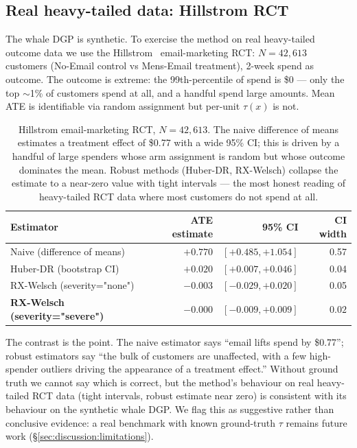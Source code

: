 \subsection{Real heavy-tailed data: Hillstrom RCT}
\label{sec:experiments:hillstrom}
The whale DGP is synthetic. To exercise the method on real
heavy-tailed outcome data we use the Hillstrom~\citep{hillstrom2008}
email-marketing RCT: $N = 42{,}613$ customers (No-Email control vs
Mens-Email treatment), 2-week spend as outcome. The outcome is
extreme: the 99th-percentile of spend is \$0 --- only the top $\sim$1\%
of customers spend at all, and a handful spend large amounts. Mean
ATE is identifiable via random assignment but per-unit
$\tau(x)$ is not.

\begin{table}[!t]
\centering
\small
\begin{tabular}{lrrr}
\toprule
Estimator & ATE estimate & 95\% CI & CI width \\
\midrule
Naive (difference of means) & $+0.770$ & $[+0.485, +1.054]$ & 0.57 \\
Huber-DR (bootstrap CI)     & $+0.020$ & $[+0.007, +0.046]$ & 0.04 \\
RX-Welsch (severity="none")   & $-0.003$ & $[-0.029, +0.020]$ & 0.05 \\
\textbf{RX-Welsch (severity="severe")} & $\mathbf{-0.000}$ & $\mathbf{[-0.009, +0.009]}$ & $\mathbf{0.02}$ \\
\bottomrule
\end{tabular}
\caption{Hillstrom email-marketing RCT, $N = 42{,}613$. The naive
difference of means estimates a treatment effect of \$0.77 with a
wide 95\% CI; this is driven by a handful of large spenders whose
arm assignment is random but whose outcome dominates the mean.
Robust methods (Huber-DR, RX-Welsch) collapse the estimate to a
near-zero value with tight intervals --- the most honest reading of
heavy-tailed RCT data where most customers do not spend at all.}
\label{tab:hillstrom}
\end{table}

The contrast is the point. The naive estimator says ``email lifts
spend by \$0.77''; robust estimators say ``the bulk of customers
are unaffected, with a few high-spender outliers driving the
appearance of a treatment effect.'' Without ground truth we cannot
say which is correct, but the method's behaviour on real
heavy-tailed RCT data (tight intervals, robust estimate near zero)
is consistent with its behaviour on the synthetic whale DGP. We
flag this as suggestive rather than conclusive evidence: a real
benchmark with known ground-truth $\tau$ remains future work
(\S\ref{sec:discussion:limitations}).

